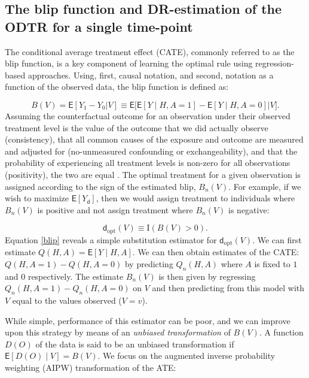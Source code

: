 \documentclass[11pt]{article}
\renewcommand{\d}{\mathsf{d}}
\newcommand{\E}{\mathsf{E}}
\theoremstyle{example}
\begin{document}
\subsection*{The blip function and DR-estimation of the ODTR for a single time-point}

The conditional average treatment effect (CATE), commonly referred to as the blip function\citep{robins2004optimal}, is a key component of learning the optimal rule using regression-based approaches.\citep{van2015targeted} Using, first, causal notation, and second, notation as a function of the observed data, the blip function is defined as: 

\begin{equation}\label{blip}
  B(V) = \E[Y_1 - Y_0 | V] \equiv \E\Big[\E[Y \mid H, A = 1] - \E[Y \mid H, A = 0] \Big| V\Big].
\end{equation}
Assuming the counterfactual outcome for an observation under their observed treatment level is the value of the outcome that we did actually observe (consistency), that all common causes of the exposure and outcome are measured and adjusted for (no-unmeasured confounding or exchangeability), and that the probability of experiencing all treatment levels is non-zero for all observations (positivity), the two are equal \citep{van2006statistical}.
The optimal treatment for a given observation is assigned according to the sign of the estimated blip, $B_n(V)$. For example, if we wish to maximize $\E [Y_\d]$, then we would assign treatment to individuals where $B_n(V)$ is positive and not assign treatment where $B_n(V)$ is negative: 

\begin{equation}\label{rule}
  \d_{\text{opt}}(V) \equiv \mathrm{I}(B(V) > 0).
\end{equation}
Equation \ref{blip} reveals a simple substitution estimator for $\d_{\text{opt}}(V)$. We can first estimate $Q(H, A) = \E[Y \mid H, A]$. We can then obtain estimates of the CATE: $Q(H, A = 1) - Q(H, A = 0)$ by predicting $Q_n(H, A)$ where $A$ is fixed to $1$ and $0$ respectively. The estimate $B_n(V)$ is then given by regressing $Q_n(H, A = 1) - Q_n(H, A = 0)$ on $V$ and then predicting from this model with $V$ equal to the values observed ($V=v$). 

While simple, performance of this estimator can be poor,\cite{kennedy2020towards} and we can improve upon this strategy by means of an \emph{unbiased transformation} of $B(V)$. A function $D(O)$ of the data is said to be an unbiased transformation if $\E[D(O) \mid V] = B(V)$. We focus on the augmented inverse probability weighting (AIPW)\citep{robins1994estimation} transformation of the ATE:
\end{document}
